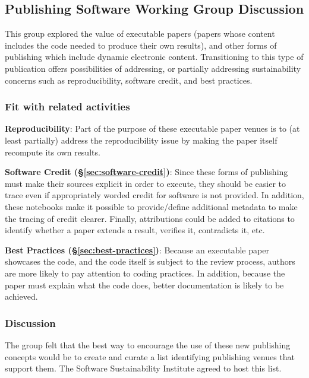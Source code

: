 \subsection{Publishing Software Working Group Discussion} \label{sec:publishing-software}

This group explored the value of executable papers (papers whose content
includes the code needed to produce their own results), and other forms of
publishing which include dynamic electronic content. 
%
%
Transitioning to this type
of publication offers possibilities of addressing, or partially addressing
sustainability concerns such as reproducibility, software credit, and best
practices.

\subsubsection{Fit with related activities}

\textbf{Reproducibility}: Part of the purpose of these executable paper venues
is to (at least partially) address the reproducibility issue by making the
paper itself recompute its own results.

\textbf{Software Credit (\S\ref{sec:software-credit})}: Since these forms of
publishing must make their sources explicit in order to execute, they should be
easier to trace even if appropriately worded credit for software is not
provided. In addition, these notebooks make it possible to provide/define
additional metadata to make the tracing of credit clearer. Finally,
attributions could be added to citations to identify whether a paper extends a
result, verifies it, contradicts it, etc.

\textbf{Best Practices (\S\ref{sec:best-practices})}: Because an executable paper
showcases the code, and the code itself is subject to the review process,
authors are more likely to pay attention to coding practices. In addition,
because the paper must explain what the code does, better documentation is
likely to be achieved.

\subsubsection{Discussion}

The group felt that the best way to encourage the use of these new publishing
concepts would be to create and curate a list identifying publishing venues
that support them. The Software Sustainability Institute agreed to host this list.

